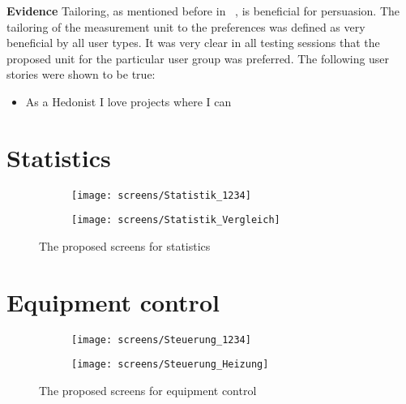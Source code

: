 \textbf{Evidence} \quad Tailoring, as mentioned before in ~, is beneficial for persuasion. The tailoring of the measurement unit to the preferences was defined as very beneficial by all user types. It was very clear in all testing sessions that the proposed unit for the particular user group was preferred. The following user stories were shown to be true: 

\begin{itemize}
	\item As a Hedonist I love projects where I can 
\end{itemize}


\section{Statistics}

\begin{figure}[h]
	\centering
	\begin{subfigure}[b]{0.24\columnwidth}
		\centering
		\texttt{[image: screens/Statistik\_1234]}
		\label{fig:statistik:professional}
	\end{subfigure}
	\begin{subfigure}[b]{0.24\columnwidth}
		\centering
		\texttt{[image: screens/Statistik\_Vergleich]}
		\label{fig:statistik:optimizer}
	\end{subfigure}
	\caption{The proposed screens for statistics}
	\label{fig:statistik} %
\end{figure}

\section{Equipment control}

\begin{figure}[h]
	\centering
	\begin{subfigure}[b]{0.24\columnwidth}
		\centering
		\texttt{[image: screens/Steuerung\_1234]}
		\label{fig:statistik:professional}
	\end{subfigure}
	\begin{subfigure}[b]{0.24\columnwidth}
		\centering
		\texttt{[image: screens/Steuerung\_Heizung]}
		\label{fig:statistik:optimizer}
	\end{subfigure}
	\caption{The proposed screens for equipment control}
	\label{fig:statistik} %
\end{figure}

